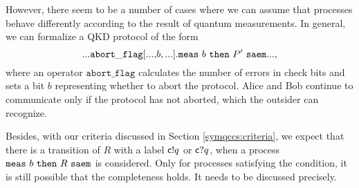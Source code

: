 However, there seem to be a number of cases where we can assume that
processes behave differently according to the result of quantum
measurements.
In general, we can formalize a QKD protocol of the form 
\[
 ... \mathtt{abort\_flag[...,}b\mathtt{,...].}{\tt meas}~b~{\tt then}~P'~{\tt saem} ...,
\]
where an operator $\mathtt{abort\_flag}$ calculates the number of errors
in check bits and sets a bit $b$ representing whether to abort the
protocol. Alice and Bob continue to communicate
only if the protocol has not aborted, which the outsider can
recognize. 

Besides, with our criteria discussed in Section \ref{symqccs:criteria},
we expect that there is a transition of $R$
with a label $\mathsf{c}! q$ or $\mathsf{c}? q$, when a process
${\tt meas}~b~{\tt then}~R~{\tt saem}$ is considered.
Only for processes satisfying the condition, it is still possible that
the completeness holds. It needs to be discussed precisely.


